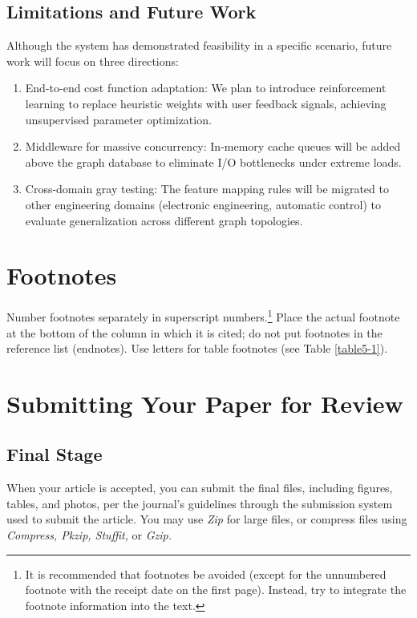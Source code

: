 \documentclass{ieeeaccess}
\begin{document}
\subsection{Limitations and Future Work}
Although the system has demonstrated feasibility in a specific scenario, future work will focus on three directions:

\begin{enumerate}
\item End-to-end cost function adaptation: We plan to introduce reinforcement learning to replace heuristic weights with user feedback signals, achieving unsupervised parameter optimization.
\item Middleware for massive concurrency: In-memory cache queues will be added above the graph database to eliminate I/O bottlenecks under extreme loads.
\item Cross-domain gray testing: The feature mapping rules will be migrated to other engineering domains (electronic engineering, automatic control) to evaluate generalization across different graph topologies.
\end{enumerate}

\appendices
\section{Footnotes}
Number footnotes separately in superscript numbers.\footnote{It is recommended that footnotes be avoided (except for
the unnumbered footnote with the receipt date on the first page). Instead,
try to integrate the footnote information into the text.} Place the actual
footnote at the bottom of the column in which it is cited; do not put
footnotes in the reference list (endnotes). Use letters for table footnotes
(see Table \ref{table5-1}).

\section{Submitting Your Paper for Review}

\subsection{Final Stage}
When your article is accepted, you can submit the final files, including figures, tables, and photos, per the journal's guidelines through the submission system used to submit the article. You may use \emph{Zip} for large files, or compress files using \emph{Compress, Pkzip, Stuffit,} or \emph{Gzip.}
\end{document}
